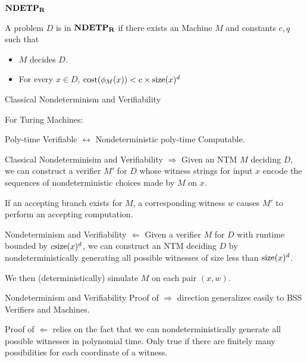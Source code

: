 \documentclass[c]{beamer}
\begin{document}
\begin{frame}{$\mathbf{NDETP_R}$}

  A problem $D$ is in $\mathbf{NDETP_R}$ if there exists an \ndet Machine $M$
  and constants $c, q$ such that 
  \begin{itemize}
  \item $M$ decides $D$.
  \item For every $x \in D$, $\text{cost}(\phi_M(x)) < c \times \text{size}(x)^d$
  \end{itemize}
  
\end{frame}

\begin{frame}{Classical Nondeterminism and Verifiability}

  For Turing Machines: 
  \begin{center}
    Poly-time Verifiable $\leftrightarrow$ Nondeterministic poly-time
    Computable.
  \end{center}
\end{frame}

\begin{frame}{Classical Nondeterminisim and Verifiability}
  $\Rightarrow$ Given an NTM $M$ deciding $D$, we can construct a
  verifier $M'$ for $D$ whose witness strings for input $x$ encode the
  sequences of nondeterministic choices made by $M$ on $x$.

  \vspace{\baselineskip}
  
  If an accepting branch exists for $M$, a corresponding witness $w$
  causes $M'$ to perform an accepting computation.
\end{frame}

\begin{frame}{Nondeterminism and Verifiability}
  $\Leftarrow$ Given a verifier $M$ for $D$ with runtime bounded by $c
  \text{size}(x)^d$, we can construct an NTM deciding $D$ by
  nondeterministically generating all possible witnesses of size less
  than $\text{size}(x)^d$.

  \vspace{\baselineskip}

  We then (deterministically) simulate $M$ on each pair $(x, w)$.
\end{frame}

\begin{frame}{Nondeterminism and Verifiability}
  Proof of $\Rightarrow$ direction generalizes easily to BSS Verifiers
  and \ndet{} Machines.\pause

  \vspace{\baselineskip}

  Proof of $\Leftarrow$ relies on the fact that we can
  nondeterministically generate all possible witnesses in polynomial
  time. Only true if there are finitely many possibilities for each
  coordinate of a witness.
\end{frame}
\end{document}
